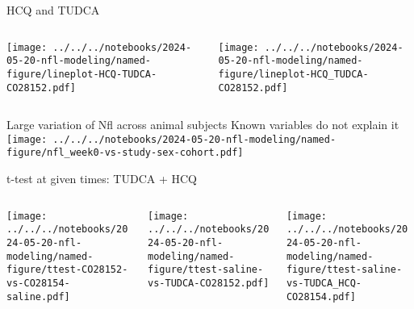 \documentclass[aspectratio=169]{beamer}
\begin{document}
\begin{frame}{HCQ and TUDCA}
\begin{columns}[t]
\begin{column}{0.6\textwidth}

  \texttt{[image: ../../../notebooks/2024-05-20-nfl-modeling/named-figure/lineplot-HCQ-TUDCA-CO28152.pdf]}
\end{column}

\begin{column}{0.4\textwidth}

  \texttt{[image: ../../../notebooks/2024-05-20-nfl-modeling/named-figure/lineplot-HCQ\_TUDCA-CO28152.pdf]}
\end{column}
\end{columns}
\end{frame}


\begin{frame}{Large variation of Nfl across animal subjects}
  {Known variables do not explain it}
  \texttt{[image: ../../../notebooks/2024-05-20-nfl-modeling/named-figure/nfl\_week0-vs-study-sex-cohort.pdf]}
\end{frame}


\begin{frame}{t-test at given times: TUDCA + HCQ}
\begin{columns}[t]

\begin{column}{0.33\textwidth}

  \texttt{[image: ../../../notebooks/2024-05-20-nfl-modeling/named-figure/ttest-CO28152-vs-CO28154-saline.pdf]}
\end{column}

\begin{column}{0.33\textwidth}

  \texttt{[image: ../../../notebooks/2024-05-20-nfl-modeling/named-figure/ttest-saline-vs-TUDCA-CO28152.pdf]}
\end{column}

\begin{column}{0.33\textwidth}

  \texttt{[image: ../../../notebooks/2024-05-20-nfl-modeling/named-figure/ttest-saline-vs-TUDCA\_HCQ-CO28154.pdf]}
\end{column}
\end{columns}
\end{frame}
\end{document}
